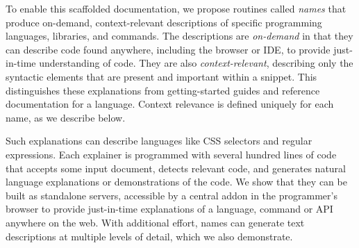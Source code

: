 \begin{figure}[!t]

\end{figure}
To enable this scaffolded documentation, we propose routines called \emph{\Glspl{name}} that produce on-demand, context-relevant descriptions of specific programming languages, libraries, and commands.
The descriptions are \emph{on-demand} in that they can describe code found anywhere, including the browser or IDE, to provide just-in-time understanding of code.
They are also \emph{context-relevant}, describing only the syntactic elements that are present and important within a snippet.
This distinguishes these explanations from getting-started guides and reference documentation for a language.
Context relevance is defined uniquely for each \gls{name}, as we describe below.

Such explanations can describe languages like CSS selectors and regular expressions.
Each explainer is programmed with several hundred lines of code that accepts some input document, detects relevant code, and generates natural language explanations or demonstrations of the code.
We show that they can be built as standalone servers, accessible by a central addon in the programmer's browser to provide just-in-time explanations of a language, command or API anywhere on the web.
With additional effort, \glspl{name} can generate text descriptions at multiple levels of detail, which we also demonstrate.

